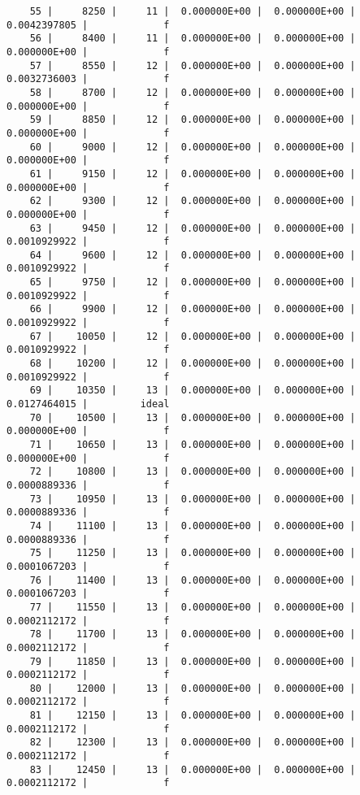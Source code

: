 \documentclass[
  authoryear,
  preprint,
  3p]{elsarticle}
\begin{document}
\begin{verbatim}
    55 |     8250 |     11 |  0.000000E+00 |  0.000000E+00 |  0.0042397805 |             f
    56 |     8400 |     11 |  0.000000E+00 |  0.000000E+00 |  0.000000E+00 |             f
    57 |     8550 |     12 |  0.000000E+00 |  0.000000E+00 |  0.0032736003 |             f
    58 |     8700 |     12 |  0.000000E+00 |  0.000000E+00 |  0.000000E+00 |             f
    59 |     8850 |     12 |  0.000000E+00 |  0.000000E+00 |  0.000000E+00 |             f
    60 |     9000 |     12 |  0.000000E+00 |  0.000000E+00 |  0.000000E+00 |             f
    61 |     9150 |     12 |  0.000000E+00 |  0.000000E+00 |  0.000000E+00 |             f
    62 |     9300 |     12 |  0.000000E+00 |  0.000000E+00 |  0.000000E+00 |             f
    63 |     9450 |     12 |  0.000000E+00 |  0.000000E+00 |  0.0010929922 |             f
    64 |     9600 |     12 |  0.000000E+00 |  0.000000E+00 |  0.0010929922 |             f
    65 |     9750 |     12 |  0.000000E+00 |  0.000000E+00 |  0.0010929922 |             f
    66 |     9900 |     12 |  0.000000E+00 |  0.000000E+00 |  0.0010929922 |             f
    67 |    10050 |     12 |  0.000000E+00 |  0.000000E+00 |  0.0010929922 |             f
    68 |    10200 |     12 |  0.000000E+00 |  0.000000E+00 |  0.0010929922 |             f
    69 |    10350 |     13 |  0.000000E+00 |  0.000000E+00 |  0.0127464015 |         ideal
    70 |    10500 |     13 |  0.000000E+00 |  0.000000E+00 |  0.000000E+00 |             f
    71 |    10650 |     13 |  0.000000E+00 |  0.000000E+00 |  0.000000E+00 |             f
    72 |    10800 |     13 |  0.000000E+00 |  0.000000E+00 |  0.0000889336 |             f
    73 |    10950 |     13 |  0.000000E+00 |  0.000000E+00 |  0.0000889336 |             f
    74 |    11100 |     13 |  0.000000E+00 |  0.000000E+00 |  0.0000889336 |             f
    75 |    11250 |     13 |  0.000000E+00 |  0.000000E+00 |  0.0001067203 |             f
    76 |    11400 |     13 |  0.000000E+00 |  0.000000E+00 |  0.0001067203 |             f
    77 |    11550 |     13 |  0.000000E+00 |  0.000000E+00 |  0.0002112172 |             f
    78 |    11700 |     13 |  0.000000E+00 |  0.000000E+00 |  0.0002112172 |             f
    79 |    11850 |     13 |  0.000000E+00 |  0.000000E+00 |  0.0002112172 |             f
    80 |    12000 |     13 |  0.000000E+00 |  0.000000E+00 |  0.0002112172 |             f
    81 |    12150 |     13 |  0.000000E+00 |  0.000000E+00 |  0.0002112172 |             f
    82 |    12300 |     13 |  0.000000E+00 |  0.000000E+00 |  0.0002112172 |             f
    83 |    12450 |     13 |  0.000000E+00 |  0.000000E+00 |  0.0002112172 |             f

\end{verbatim}
\end{document}

